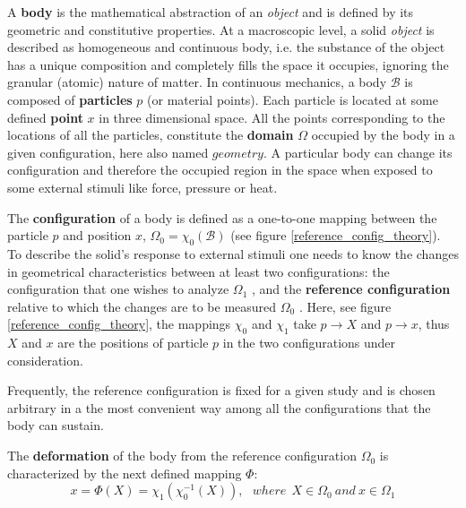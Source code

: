	A \textbf{body} is the mathematical abstraction of an \textit{object} and is defined by its geometric and constitutive properties.  At a macroscopic level, a solid \textit{object} is described as homogeneous and continuous body, i.e. the substance of the object has a unique composition and completely fills the space it occupies, ignoring the granular (atomic) nature of matter. In continuous mechanics, a body $\mathcal{B}$ is composed of \textbf{particles} $p$  (or material points). Each particle is located at some defined \textbf{point}  $x$ in three dimensional space. All the points corresponding to the locations of all the particles, constitute the \textbf{domain} $\Omega$  occupied by the body in a given configuration, here also named $geometry$. A particular body can change its configuration and therefore the occupied region in the space when exposed to some external stimuli like force, pressure or heat.
	
 The \textbf{configuration} of a body is defined as a one-to-one mapping between the particle $p$ and position $x$, $\Omega_0 = \chi_0 (\mathcal{B})$ (see figure \ref{reference_config_theory}). To describe the solid's response to external stimuli one needs to know the changes in geometrical characteristics between at least two configurations: the configuration that one wishes to analyze $\Omega_1$ , and the \textbf{reference configuration} relative to which the changes are to be measured $\Omega_0$  . Here, see figure \ref{reference_config_theory}, the mappings $\chi_0$ and $\chi_1$ take $p \rightarrow X$ and $p \rightarrow x$, thus $X$ and $x$ are the positions of particle $p$ in the two configurations under consideration.

Frequently, the reference configuration is fixed for a given study and is chosen arbitrary in a the most convenient way among all the configurations that the body can sustain. 
 
 The \textbf{deformation} of the body from the reference configuration $\Omega_0$ is characterized by the next defined mapping $\Phi$:
 \begin{equation} 
 x = \Phi(X) = \chi_1(\chi_0^{-1}(X)), \ \ \  where \ \  X \in \Omega_0 \ and \ x \in \Omega_1
 \label{referenceToCurrentCoordinates}
 \end{equation}
 
